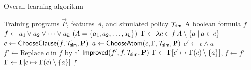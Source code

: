 \begin{algorithm}[t]
  \caption{Overall learning algorithm}\label{alg:overall1}\small
  \begin{algorithmic}[1]
    \Require Training programs $\vec{P}$, features $A$, and simulated
    policy $\mathcal{T}_{{\sf sim}}$ \Ensure A boolean formula $f$
     \State
    $f \gets a_1 \vee a_2 \vee \dots \vee a_k ~(A =
    \{ a_1,a_2,\dots,a_k \})$ \State
    $\Gamma \gets \lambda c \in f. A \setminus \{ a \mid a
      \in c \}$ \Repeat \State $c \gets {\sf ChooseClause}(f,\mathcal{T}_{{\sf sim}},\mathbf{P})$ \State
    $a \gets {\sf ChooseAtom}(c, \Gamma,\mathcal{T}_{{\sf sim}},\mathbf{P})$ \State $c' \gets c \land a$
    \State $f' \gets \mbox{Replace $c$ in $f$ by $c'$}$ \If
    {${\sf Improved}(f', f,\mathcal{T}_{{\sf sim}},\mathbf{P})$} \State
    $\Gamma \gets \Gamma[c' \mapsto \Gamma(c) \setminus
    \{ a \}]$, $f \gets f'$ \Else \State
    $\Gamma \gets \Gamma[c \mapsto \Gamma(c) \setminus
    \{ a \}]$ \EndIf {} \State \Return $f$
    \EndProcedure
  \end{algorithmic}
\end{algorithm}





